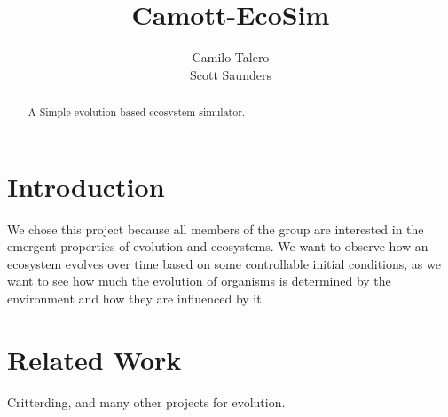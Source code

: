 \documentclass[runningheads]{llncs}
\begin{document}
\title{Camott-EcoSim}

\author{Camilo Talero \\  Scott Saunders  }


\maketitle


\begin{abstract} 
A Simple evolution based ecosystem simulator.
\end{abstract}


\section{Introduction}
\label{sec:Introduction}
%
We chose this project because all members of the group are interested in the emergent properties of evolution and ecosystems. We want to observe how an ecosystem evolves over time based on some controllable initial conditions, as we want to see how much the evolution of organisms is determined by the environment and how they are influenced by it.

\section{Related Work}
Critterding, and many other projects for evolution.
\end{document}
